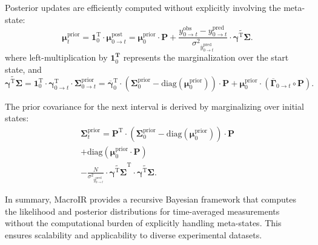 \documentclass[pdflatex,sn-mathphys-num]{sn-jnl}%
\theoremstyle{thmstyleone}%
\theoremstyle{thmstyletwo}%
\theoremstyle{thmstylethree}%
\begin{document}
Posterior updates are efficiently computed without explicitly involving the meta-state:
\begin{equation}
	\mathbf{\mu}^{\mathrm{prior}}_{t} = 
	\mathbf{1}_0^{\mathrm{T}} \cdot 
	\mathbf{\mu}^{\mathrm{post}}_{0 \rightarrow t} = \mathbf{\mu}^{\mathrm{prior}}_0 \cdot \boldsymbol{P} + 
	\frac{y^{\mathrm{obs}}_{0 \rightarrow t} - y^{\mathrm{pred}}_{0 \rightarrow t}}{{\sigma^2}_{\overline{y}^{\mathrm{pred}}_{0 \rightarrow t}}} 
	\cdot \widetilde{\boldsymbol{\gamma}^{\mathrm{T}} \boldsymbol{\Sigma}}.
	\label{eq:macro_interval_posterior_mean}
\end{equation}
where left-multiplication by \( \mathbf{1}_0^{\mathbf{T}} \) represents the marginalization over the start state, and
\begin{equation}
	\widetilde{\boldsymbol{\gamma}^{\mathrm{T}} \boldsymbol{\Sigma}} = \mathbf{1}_0^{\mathrm{T}} \cdot \mathbf{\gamma}^{\mathrm{T}}_{0 \rightarrow t} \cdot \mathbf{\Sigma}^{\mathrm{prior}}_{0 \rightarrow t} =
	\overline{\boldsymbol{\gamma}}_{0}^{\mathrm{T}} \cdot 
	\left( \boldsymbol{\Sigma}^{\mathrm{prior}}_{0} - \mathrm{diag}(\boldsymbol{\mu}^{\mathrm{prior}}_0) \right) \cdot \boldsymbol{P} 
	+ \boldsymbol{\mu}^{\mathrm{prior}}_0 \cdot \left( \overline{\boldsymbol{\Gamma}}_{0 \rightarrow t} \circ \boldsymbol{P} \right).
	\label{eq:interval_gamma_sigma}
\end{equation}

The prior covariance for the next interval is derived by marginalizing over initial states:
\begin{multline}
	\boldsymbol{\Sigma}^{\mathrm{prior}}_{t} = 
	\boldsymbol{P}^{\mathrm{T}} \cdot \left( \boldsymbol{\Sigma}^{\mathrm{prior}}_{0} - \mathrm{diag}(\boldsymbol{\mu}^{\mathrm{prior}}_{0}) \right) \cdot \boldsymbol{P} \\
	+ \mathrm{diag}(\boldsymbol{\mu}^{\mathrm{prior}}_{0} \cdot \boldsymbol{P}) \\
	- \frac{N}{{\sigma^2}_{\overline{y}^{\mathrm{pred}}_{0 \rightarrow t}}} \cdot
	\widetilde{\boldsymbol{\gamma}^{\mathrm{T}} \boldsymbol{\Sigma}}^{\mathrm{T}} \cdot \widetilde{\boldsymbol{\gamma}^{\mathrm{T}} \boldsymbol{\Sigma}}.
	\label{eq:prior_covariance_update_0_t}
\end{multline}

In summary, MacroIR provides a recursive Bayesian framework that computes the likelihood and posterior distributions for time-averaged measurements without the computational burden of explicitly handling meta-states. This ensures scalability and applicability to diverse experimental datasets.
\end{document}
